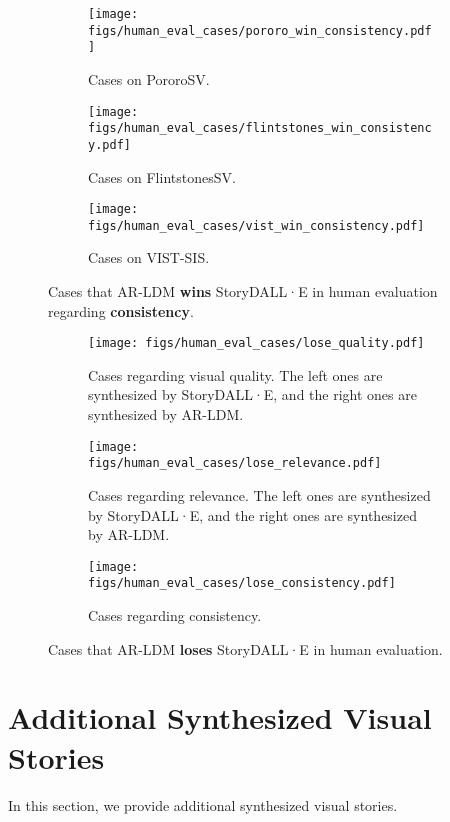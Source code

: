\documentclass[10pt,twocolumn,letterpaper]{article}
\begin{document}
\begin{figure*}[!h]
\centering
\begin{subfigure}{\linewidth}
\centering
\texttt{[image: figs/human\_eval\_cases/pororo\_win\_consistency.pdf]}
\caption{Cases on PororoSV.}
\end{subfigure}
\vfill
\begin{subfigure}{\linewidth}
\centering
\texttt{[image: figs/human\_eval\_cases/flintstones\_win\_consistency.pdf]}
\caption{Cases on FlintstonesSV.}
\end{subfigure}
\vfill
\begin{subfigure}{\linewidth}
\centering
\texttt{[image: figs/human\_eval\_cases/vist\_win\_consistency.pdf]}
\caption{Cases on VIST-SIS.}
\end{subfigure}
\caption{Cases that AR-LDM \textbf{wins} StoryDALL·E in human evaluation regarding \textbf{consistency}.}
\label{fig:win_consistency}
\end{figure*}

\begin{figure*}[!h]
\centering
\begin{subfigure}{\linewidth}
\centering
\texttt{[image: figs/human\_eval\_cases/lose\_quality.pdf]}
\caption{Cases regarding visual quality. The left ones are synthesized by StoryDALL·E, and the right ones are synthesized by AR-LDM.}
\end{subfigure}
\vfill
\begin{subfigure}{\linewidth}
\centering
\texttt{[image: figs/human\_eval\_cases/lose\_relevance.pdf]}
\caption{Cases regarding relevance. The left ones are synthesized by StoryDALL·E, and the right ones are synthesized by AR-LDM.}
\end{subfigure}
\vfill
\begin{subfigure}{\linewidth}
\centering
\texttt{[image: figs/human\_eval\_cases/lose\_consistency.pdf]}
\caption{Cases regarding consistency.}
\end{subfigure}
\caption{Cases that AR-LDM \textbf{loses} StoryDALL·E in human evaluation.}
\label{fig:lose}
\end{figure*}

\clearpage
\section{Additional Synthesized Visual Stories}
\label{sec:additional_synthesized_visual_stories}
In this section, we provide additional synthesized visual stories.
\setlength\parindent{0pt}
\end{document}
